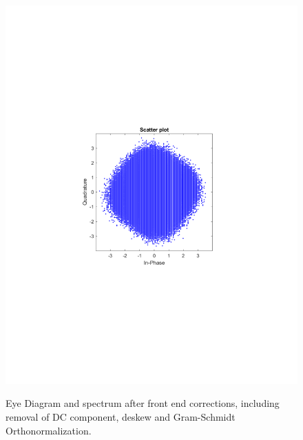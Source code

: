 \begin{refsection}
\begin{figure}[H]
\begin{minipage}{0.30\textwidth}
		\includegraphics[clip, trim=4cm 8cm 4cm 8cm, width=1\textwidth]{./sdf/m_qam_system/figures/expResults/homodyne/1_const_16GBdInSig13dB_AfFec.pdf}
		\label{fig:16GBdSpecBefFec}
	\end{minipage}
	\caption{Eye Diagram and spectrum after front end corrections, including removal of DC component, deskew and Gram-Schmidt Orthonormalization.}
\end{figure}


\end{refsection}
